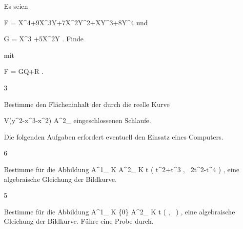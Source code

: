 {}
{





Es seien

\mavergleichskettedisp
{\vergleichskette
{F
}
{ =} { X^4+9X^3Y+7X^2Y^2+XY^3+8Y^4
}
{ } {
}
{ } {
}
{ } {
}
}
{}{}{}
und

\mavergleichskettedisp
{\vergleichskette
{G
}
{ =} { X^3 +5X^2Y
}
{ } {
}
{ } {
}
{ } {
}
}
{}{}{.}
Finde

 mit

\mavergleichskettedisp
{\vergleichskette
{F
}
{ =} { GQ+R
}
{ } {
}
{ } {
}
{ } {
}
}
{}{}{.}





}
{} {}






{3}
{





Bestimme den Flächeninhalt der durch die reelle Kurve

\mavergleichskettedisp
{\vergleichskette
{V(y^2-x^3-x^2)
}
{ \subset} { {\mathbb A}^{2}_{\R}
}
{ } {
}
{ } {
}
{ } {
}
}
{}{}{}
eingeschlossenen Schlaufe.





}
{} {}

Die folgenden Aufgaben erfordert eventuell den Einsatz eines Computers.

{6}
{





Bestimme für die Abbildung
\maabbeledisp {} { {\mathbb A}^{1}_{ K } } { {\mathbb A}^{2}_{ K }
} { t } {   \left(  t^2+t^3   , \,   2t^2-t^4                   \right)
} {,}
eine algebraische Gleichung der Bildkurve.





}
{} {}

{5}
{





Bestimme für die Abbildung
\maabbeledisp {} { {\mathbb A}^{1}_{ K } \setminus \{0\}} { {\mathbb A}^{2}_{ K }
} { t } { \left(  {  }   , \,   {  }                   \right)
} {,}
eine algebraische Gleichung der Bildkurve. Führe eine Probe durch.





}
{} {}

